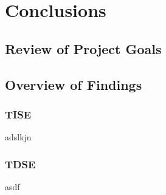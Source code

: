 
\chapter{Conclusions} %

\label{Conc} %


\newcommand{\keyword}[1]{\textbf{#1}}
\newcommand{\tabhead}[1]{\textbf{#1}}
\newcommand{\code}[1]{\texttt{#1}}
\newcommand{\file}[1]{\texttt{\bfseries#1}}
\newcommand{\option}[1]{\texttt{\itshape#1}}


\section{Review of Project Goals}





\section{Overview of Findings}
\subsection{TISE}
adslkjn 
\subsection{TDSE}
asdf 
